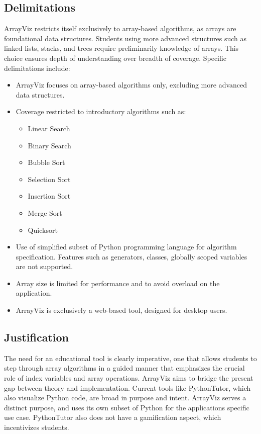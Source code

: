 \documentclass{IEEEtran}
\begin{document}
\subsection{Delimitations}
ArrayViz restricts itself exclusively to array-based algorithms, as arrays are foundational data structures. Students using more advanced structures such as linked lists, stacks, and trees require preliminarily knowledge of arrays. This choice ensures depth of understanding over breadth of coverage. Specific delimitations include:

\begin{itemize}
    \item ArrayViz focuses on array-based algorithms only, excluding more advanced data structures.
    \item Coverage restricted to introductory algorithms such as: 
    \begin{itemize}
        \item Linear Search
        \item Binary Search
        \item Bubble Sort
        \item Selection Sort
        \item Insertion Sort
        \item Merge Sort
        \item Quicksort
    \end{itemize}
    \item Use of simplified subset of Python programming language for algorithm specification. Features such as generators, classes, globally scoped variables are not supported.
    \item Array size is limited for performance and to avoid overload on the application.
    \item ArrayViz is exclusively a web-based tool, designed for desktop users.
\end{itemize}
    
\subsection{Justification}
The need for an educational tool is clearly imperative, one that allows students to step through array algorithms in a guided manner that emphasizes the crucial role of index variables and array operations. ArrayViz aims to bridge the present gap between theory and implementation. Current tools like PythonTutor, which also visualize Python code, are broad in purpose and intent. ArrayViz serves a distinct purpose, and uses its own subset of Python for the applications specific use case. PythonTutor also does not have a gamification aspect, which incentivizes students. 
\end{document}
